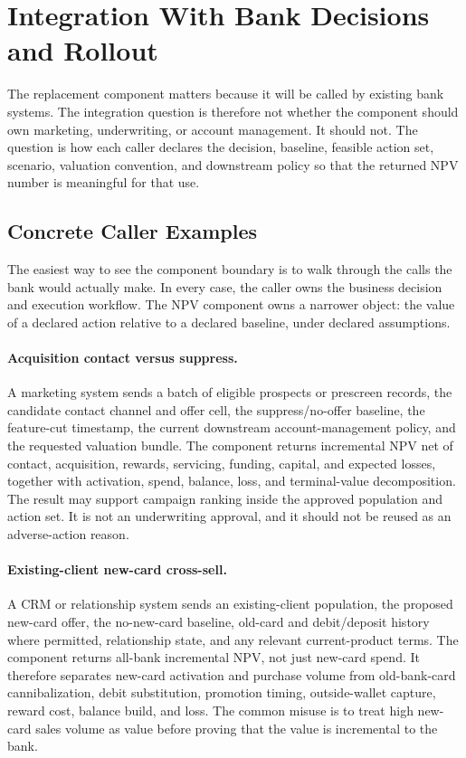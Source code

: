 \documentclass[11pt]{article}
\newcommand{\1}{\mathbf{1}}
\begin{document}
\section{Integration With Bank Decisions and Rollout}
\label{sec:v4-integration-rollout}

The replacement component matters because it will be called by existing bank
systems.  The integration question is therefore not whether the component should
own marketing, underwriting, or account management.  It should not.  The
question is how each caller declares the decision, baseline, feasible action set,
scenario, valuation convention, and downstream policy so that the returned NPV
number is meaningful for that use.

\subsection{Concrete Caller Examples}
\label{subsec:concrete-caller-examples}

The easiest way to see the component boundary is to walk through the calls the
bank would actually make. In every case, the caller owns the business decision
and execution workflow. The NPV component owns a narrower object: the value of a
declared action relative to a declared baseline, under declared assumptions.

\paragraph{Acquisition contact versus suppress.}
A marketing system sends a batch of eligible prospects or prescreen records,
the candidate contact channel and offer cell, the suppress/no-offer baseline,
the feature-cut timestamp, the current downstream account-management policy,
and the requested valuation bundle. The component returns incremental NPV net
of contact, acquisition, rewards, servicing, funding, capital, and expected
losses, together with activation, spend, balance, loss, and terminal-value
decomposition. The result may support campaign ranking inside the approved
population and action set. It is not an underwriting approval, and it should not
be reused as an adverse-action reason.

\paragraph{Existing-client new-card cross-sell.}
A CRM or relationship system sends an existing-client population, the proposed
new-card offer, the no-new-card baseline, old-card and debit/deposit history
where permitted, relationship state, and any relevant current-product terms.
The component returns all-bank incremental NPV, not just new-card spend. It
therefore separates new-card activation and purchase volume from old-bank-card
cannibalization, debit substitution, promotion timing, outside-wallet capture,
reward cost, balance build, and loss. The common misuse is to treat high
new-card sales volume as value before proving that the value is incremental to
the bank.
\end{document}

